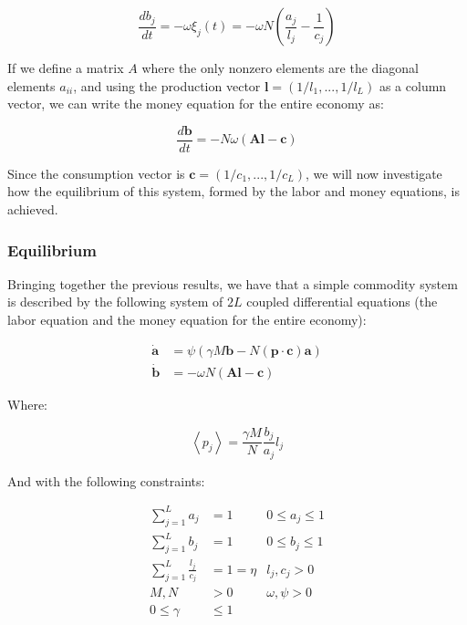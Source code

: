 $$\frac{db_{j}}{dt}=-\omega\xi_{j}\left(t\right)=-\omega N\left(\frac{a_{j}}{l_{j}}-\frac{1}{c_{j}}\right)$$

If we define a matrix $A$ where the only nonzero elements are the diagonal elements $a_{ii}$, and using the production vector $\boldsymbol{l}=(1/l_1,...,1/l_L)$ as a column vector, we can write the money equation for the entire economy as:


$$\frac{d\boldsymbol{b}}{dt}=-N\omega\left(\boldsymbol{A}\boldsymbol{l}-\boldsymbol{c}\right)$$

Since the consumption vector is $\boldsymbol{c}=(1/c_1,...,1/c_L)$, we will now investigate how the equilibrium of this system, formed by the labor and money equations, is achieved.

\subsubsection{Equilibrium}

Bringing together the previous results, we have that a simple commodity system is described by the following system of $2L$ coupled differential equations (the labor equation and the money equation for the entire economy):


\begin{align*}
\dot{\boldsymbol{a}} & =\psi\left(\gamma M\boldsymbol{b}-N\left(\boldsymbol{p}\cdot\boldsymbol{c}\right)\boldsymbol{a}\right)\\
\dot{\boldsymbol{b}} & =-\omega N\left(\boldsymbol{A}\boldsymbol{l}-\boldsymbol{c}\right)
\end{align*}

Where:

$$\left\langle p_{j}\right\rangle =\frac{\gamma M}{N}\frac{b_{j}}{a_{j}}l_{j}$$


And with the following constraints:


\begin{align*}
\sum_{j=1}^{L}a_{j} & =1 & 0\leq a_{j}\leq1\\
\sum_{j=1}^{L}b_{j} & =1 & 0\leq b_{j}\leq1\\
\sum_{j=1}^{L}\frac{l_{j}}{c_{j}} & =1=\eta & l_{j},c_{j}>0\\
M,N & >0 & \omega,\psi>0\\
0\leq\gamma & \leq1
\end{align*}


